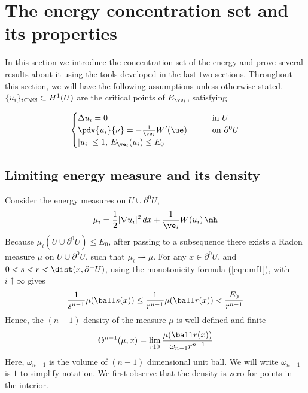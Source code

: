 \section{The energy concentration set and its properties}
In this section we introduce the concentration set of the energy and prove several results about it using the tools developed in the last two sections. Throughout this section, we will have the following assumptions unless otherwise stated. $\{u_i\}_{i\in \NN} \subset H^1(U)$ are the critical points of $E_{\ve_i}$, satisfying

 \begin{equation} \label{sec4eqn}
        \begin{cases}
            \Delta u_i = 0 \qquad &\text{in } U \\
            \pdv{u_i}{\nu} = -\frac{1}{\ve_i}W'(\ue) \qquad  &\text{on  } \partial^0 U \\
            |u_i|\leq 1$, $E_{\ve_i}(u_i) \leq E_0
        \end{cases}
\end{equation}


\subsection{Limiting energy measure and its density}Consider the energy measures on $U \cup \partial^0U$,
$$ \mu_i = \frac{1}{2}|\nabla u_i|^2 \,dx + \frac{1}{\ve_i}W(u_i) \,\mh $$
Because $\mu_i(U \cup \partial^0U) \leq E_0$, after passing to a subsequence there exists a Radon measure $\mu$ on $U\cup \partial^0U$, such that $ \mu_i \rightharpoonup \mu $. For any $x \in \partial^0U$, and $0<s<r<\dist(x,\partial^+U)$, using the monotonicity formula (\ref{eqn:mf1}), with $i \uparrow \infty$ gives 
$$ \frac{1}{s^{n-1}} \mu(\ball s (x)) \leq \frac{1}{r^{n-1}} \mu(\ball r (x)) < \frac{E_0}{r^{n-1}} $$
Hence, the $(n-1)$ density of the measure $\mu$ is well-defined and finite 
\begin{equation}
    \Theta^{n-1}(\mu,x) = \lim_{r \downarrow 0} \frac{\mu(\ball r (x))}{\omega_{n-1}r^{n-1}}
\end{equation}
Here, $\omega_{n-1}$ is the volume of $(n-1)$ dimensional unit ball. We will write $\omega_{n-1}$ is $1$ to simplify notation. We first observe that the density is zero for points in the interior. 

